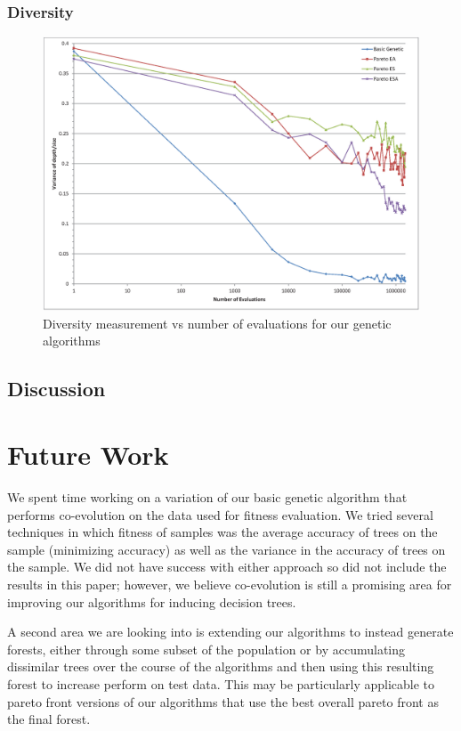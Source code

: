 \documentclass{acm_proc_article-sp}
\begin{document}
\subsubsection{Diversity}

\begin{figure}[h]
\centering
\includegraphics[width=\linewidth]{diversity_chart.eps}
\caption{Diversity measurement vs number of evaluations for our genetic algorithms}
\end{figure}

\subsection{Discussion}



\section{Future Work}

We spent time working on a variation of our basic genetic algorithm that performs co-evolution on the data used for fitness evaluation. We tried several techniques in which fitness of samples was the average accuracy of trees on the sample (minimizing accuracy) as well as the variance in the accuracy of trees on the sample. We did not have success with either approach so did not include the results in this paper; however, we believe co-evolution is still a promising area for improving our algorithms for inducing decision trees.

A second area we are looking into is extending our algorithms to instead generate forests, either through some subset of the population or by accumulating dissimilar trees over the course of the algorithms and then using this resulting forest to increase perform on test data. This may be particularly applicable to pareto front versions of our algorithms that use the best overall pareto front as the final forest.
\end{document}
